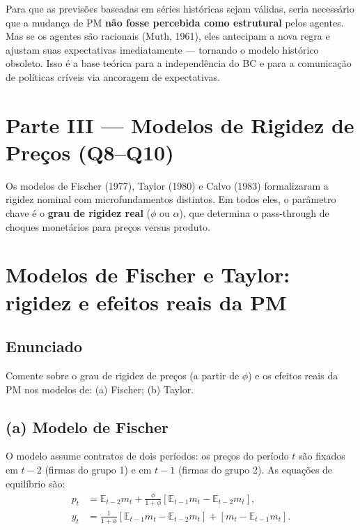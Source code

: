\documentclass[12pt, a4paper]{article}
\newcommand{\E}{\mathbb{E}}
\begin{document}
\begin{provabox}[title={Implicação para política econômica}]
Para que as previsões baseadas em séries históricas sejam válidas, seria necessário
que a mudança de PM \textbf{não fosse percebida como estrutural} pelos agentes.
Mas se os agentes são racionais (Muth, 1961), eles antecipam a nova regra e ajustam
suas expectativas imediatamente --- tornando o modelo histórico obsoleto.
Isso é a base teórica para a independência do BC e para a comunicação de políticas
críveis via ancoragem de expectativas.
\end{provabox}


\newpage
\section*{\large\color{cyanrbc} Parte III --- Modelos de Rigidez de Preços (Q8--Q10)}

Os modelos de Fischer (1977), Taylor (1980) e Calvo (1983) formalizaram a rigidez
nominal com microfundamentos distintos. Em todos eles, o parâmetro chave é o
\textbf{grau de rigidez real} ($\phi$ ou $\alpha$), que determina o pass-through
de choques monetários para preços versus produto.

\bigskip

\section{Modelos de Fischer e Taylor: rigidez e efeitos reais da PM}

\subsection*{Enunciado}
Comente sobre o grau de rigidez de preços (a partir de $\phi$) e os efeitos reais
da PM nos modelos de: (a) Fischer; (b) Taylor.

\subsection*{(a) Modelo de Fischer}

O modelo assume contratos de dois períodos: os preços do período $t$ são fixados em
$t-2$ (firmas do grupo 1) e em $t-1$ (firmas do grupo 2). As equações de equilíbrio são:
\begin{align}
p_t &= \E_{t-2}m_t + \frac{\phi}{1+\phi}\left[\E_{t-1}m_t - \E_{t-2}m_t\right], \\
y_t &= \frac{1}{1+\phi}\left[\E_{t-1}m_t - \E_{t-2}m_t\right] + \left[m_t - \E_{t-1}m_t\right].
\end{align}
\end{document}
